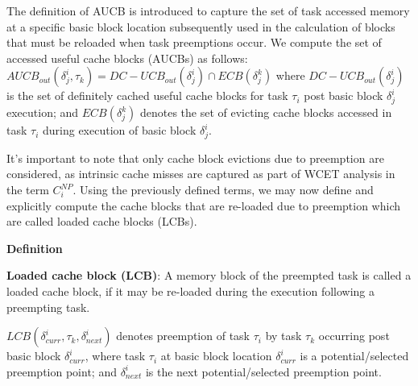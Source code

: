 The definition of AUCB is introduced to capture the set of task accessed memory at a specific basic block location subsequently used in the calculation of blocks that must be reloaded when task preemptions occur.  We compute the set of accessed useful cache blocks (AUCBs) as follows:
\begin{math}AUCB_{out}(\delta_{j}^{i},\tau_{k}) = DC-UCB_{out}(\delta_{j}^{i}) \cap ECB(\delta_{j}^{k})\end{math} where \begin{math}DC-UCB_{out}(\delta_{j}^{i})\end{math} is the set of definitely cached useful cache blocks for task \begin{math}\tau_{i}\end{math} post basic block \begin{math}\delta_{j}^{i}\end{math} execution; and \begin{math}ECB(\delta_{j}^{k})\end{math} denotes the set of evicting cache blocks accessed in task \begin{math}\tau_{i}\end{math} during execution of basic block \begin{math}\delta_{j}^{i}\end{math}.

It’s important to note that only cache block evictions due to preemption are considered, as intrinsic cache misses are captured as part of WCET analysis in the term \begin{math}C_{i}^{NP}\end{math}.  Using the previously defined terms, we may now define and explicitly compute the cache blocks that are re-loaded due to preemption which are called loaded cache blocks (LCBs).

\textbf{Definition}

\textbf{Loaded cache block (LCB)}: A memory block of the preempted task is called a loaded cache block, if it may be re-loaded during the execution following a preempting task.  

\begin{math}LCB(\delta_{curr}^{i},\tau_{k},\delta_{next}^{i})\end{math} denotes preemption of task \begin{math}\tau_{i}\end{math} by task \begin{math}\tau_{k}\end{math} occurring post basic block \begin{math}\delta_{curr}^{i}\end{math}, where task \begin{math}\tau_{i}\end{math} at basic block location \begin{math}\delta_{curr}^{i}\end{math} is a potential/selected preemption point; and \begin{math}\delta_{next}^{i}\end{math} is the next potential/selected preemption point.

